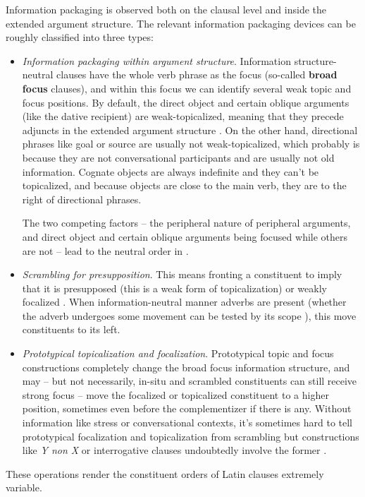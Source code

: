 \documentclass[a4paper, oneside, 12pt]{report}
\newcommand*{\citesec}[1]{\S~{#1}}
\newcommand*{\citechap}[1]{chap.~{#1}}
\newcommand*{\citepage}[1]{p.~{#1}}
\newcommand*{\citepages}[1]{pp.~{#1}}
\newcommand*{\concept}[1]{\textbf{#1}}
\newcommand{\form}[1]{\emph{#1}}
\begin{document}
Information packaging is observed both on the clausal level
and inside the extended argument structure.
The relevant information packaging devices can be roughly classified into three types:
\begin{itemize}
    \item \emph{Information packaging within argument structure}.
    Information structure-neutral clauses have the whole verb phrase as the focus
    (so-called \concept{broad focus} clauses),
    and within this focus we can identify several weak topic and focus positions.
    By default, the direct object and certain oblique arguments 
    (like the dative recipient)
    are weak-topicalized,
    meaning that they precede adjuncts in the extended argument structure 
    \citep[\citesec{1.5}]{devine2006latin}.
    On the other hand, directional phrases like goal or source are usually not weak-topicalized,
    which probably is because they are not conversational participants
    and are usually not old information.
    Cognate objects are always indefinite and they can't be topicalized,
    and because objects are close to the main verb,
    they are to the right of directional phrases.

    The two competing factors -- the peripheral nature of peripheral arguments,
    and direct object and certain oblique arguments being focused while others are not --
    lead to the neutral order in . 

    \item \emph{Scrambling for presupposition}.
    This means fronting a constituent to imply that it is presupposed 
    (this is a weak form of topicalization) 
    or weakly focalized \citep[\citepages{102,108-109}]{devine2006latin}.
    When information-neutral manner adverbs are present
    (whether the adverb undergoes some movement can be tested by its scope \citep[\citepage{100}]{devine2006latin}),
    this move constituents to its left.

    \item \emph{Prototypical topicalization and focalization}.  
    Prototypical topic and focus constructions completely change the broad focus information structure,
    and may -- but not necessarily, in-situ and scrambled constituents can still receive strong focus -- 
    move the focalized or topicalized constituent to a higher position,
    sometimes even before the complementizer if there is any.
    Without information like stress or conversational contexts,
    it's sometimes hard to tell prototypical focalization and topicalization from scrambling
    but constructions like \form{Y non X} or interrogative clauses
    undoubtedly involve the former
    \citep[\citechap{3}]{devine2006latin}.
\end{itemize}
These operations render the constituent orders of Latin clauses extremely variable.
\end{document}
